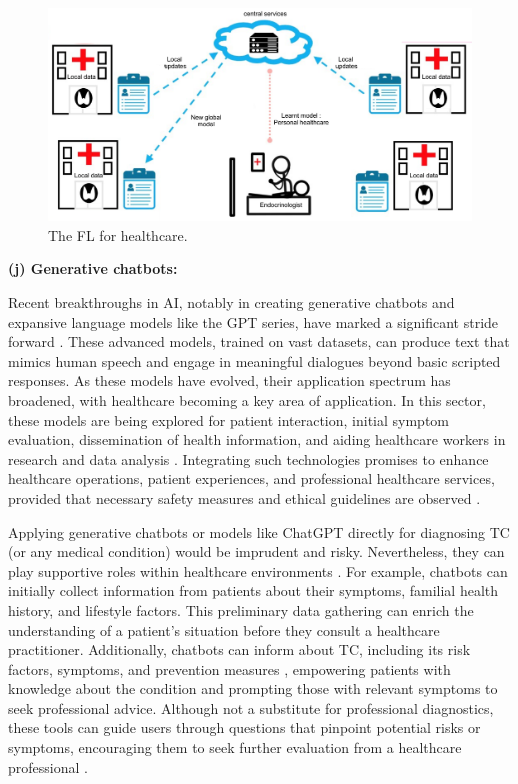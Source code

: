 \documentclass[a4paper,fleqn]{cas-sc}
\begin{document}
\begin{figure}[t!]
\begin{center}
\includegraphics[width=1\columnwidth]{fig14.pdf}
\end{center}
\caption{The \ac{FL} for healthcare. }
\label{fig14}
\end{figure}


\vskip2mm
\noindent \textbf{(j) Generative chatbots: } 

Recent breakthroughs in \ac{AI}, notably in creating generative chatbots and expansive language models like the GPT series, have marked a significant stride forward \cite{sohail2023using}. These advanced models, trained on vast datasets, can produce text that mimics human speech and engage in meaningful dialogues beyond basic scripted responses. As these models have evolved, their application spectrum has broadened, with healthcare becoming a key area of application. In this sector, these models are being explored for patient interaction, initial symptom evaluation, dissemination of health information, and aiding healthcare workers in research and data analysis \cite{sohail2023decoding}. Integrating such technologies promises to enhance healthcare operations, patient experiences, and professional healthcare services, provided that necessary safety measures and ethical guidelines are observed \cite{farhat2023analyzing}.

Applying generative chatbots or models like ChatGPT directly for diagnosing TC (or any medical condition) would be imprudent and risky. Nevertheless, they can play supportive roles within healthcare environments \cite{sohail2023future}. For example, chatbots can initially collect information from patients about their symptoms, familial health history, and lifestyle factors. This preliminary data gathering can enrich the understanding of a patient's situation before they consult a healthcare practitioner. Additionally, chatbots can inform about TC, including its risk factors, symptoms, and prevention measures \cite{haver2023appropriateness}, empowering patients with knowledge about the condition and prompting those with relevant symptoms to seek professional advice. Although not a substitute for professional diagnostics, these tools can guide users through questions that pinpoint potential risks or symptoms, encouraging them to seek further evaluation from a healthcare professional \cite{cao2023accuracy}.
\end{document}
